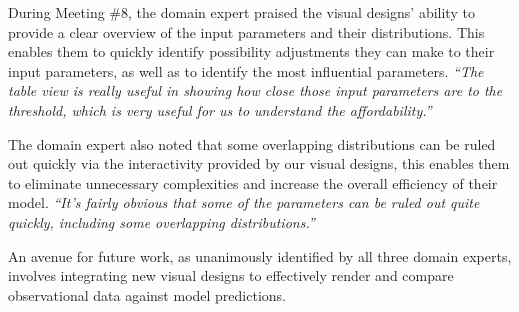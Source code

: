 During Meeting \#8, the domain expert praised the visual designs' ability to provide a clear overview of the input parameters and their distributions. This enables them to quickly identify possibility adjustments they can make to their input parameters, as well as to identify the most influential parameters.
\textit{
``The table view is really useful in showing how close those input parameters are to the threshold, which is very useful for us to understand the affordability.''
}

The domain expert also noted that some overlapping distributions can be ruled out quickly via the interactivity provided by our visual designs, this enables them to eliminate unnecessary complexities and increase the overall efficiency of their model.
\textit{
``It's fairly obvious that some of the parameters can be ruled out quite quickly, including some overlapping distributions.''
}

An avenue for future work, as unanimously identified by all three domain experts, involves integrating new visual designs to effectively render and compare observational data against model predictions.
